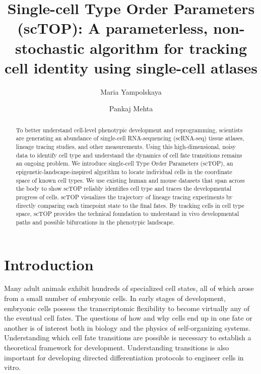 \documentclass[aps,superscriptaddress, notitlepage,longbibliography]{revtex4-1}
\begin{document}
\title{Single-cell Type Order Parameters (scTOP): A parameterless, non-stochastic algorithm for tracking cell identity using single-cell atlases}

\author{Maria Yampolskaya}

\author{Pankaj Mehta}


\begin{abstract}
To better understand cell-level phenotypic development and reprogramming, scientists are generating an abundance of single-cell RNA-sequencing (scRNA-seq) tissue atlases, lineage tracing studies, and other measurements. Using this high-dimensional, noisy data to identify cell type and understand the dynamics of cell fate transitions remains an ongoing problem. We introduce single-cell Type Order Parameters (scTOP), an epigenetic-landscape-inspired algorithm to locate individual cells in the coordinate space of known cell types. We use existing human and mouse datasets that span across the body to show scTOP reliably identifies cell type and traces the developmental progress of cells. scTOP visualizes the trajectory of lineage tracing experiments by directly comparing each timepoint state to the final fates. By tracking cells in cell type space, scTOP provides the technical foundation to understand in vivo developmental paths and possible bifurcations in the phenotypic landscape.
\end{abstract}

\maketitle

\section{Introduction}
Many adult animals exhibit hundreds of specialized cell states, all of which arose from a small number of embryonic cells. In early stages of development, embryonic cells possess the transcriptomic flexibility to become virtually any of the eventual cell fates. The questions of how and why cells end up in one fate or another is of interest both in biology and the physics of self-organizing systems. Understanding which cell fate transitions are possible is necessary to establish a theoretical framework for development. Understanding transitions is also important for developing directed differentiation protocols to engineer cells in vitro.
\end{document}
